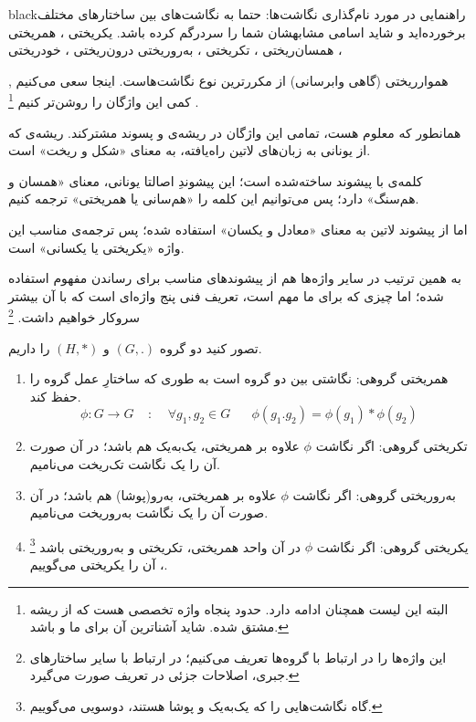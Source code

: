 \documentclass{article}
\begin{document}
\begin{boxes}{black}{راهنمایی در مورد نام‌گذاری نگاشت‌ها:}
	حتما به نگاشت‌های بین ساختارهای مختلف برخورده‌اید و شاید اسامی مشابهشان شما را سردرگم کرده باشد. یکریختی
	، همریختی
	، همسان‌ریختی
	، تکریختی
	، به‌روریختی
	درون‌ریختی
	،
	خودریختی
	
	, هموارریختی
	(گاهی وابرسانی)
	از مکررترین نوع نگاشت‌هاست. اینجا سعی می‌کنیم کمی این واژگان را روشن‌تر کنیم
	\footnote{البته این لیست همچنان ادامه دارد. حدود پنجاه واژه تخصصی هست که از ریشه 
		مشتق شده. شاید آشناترین آن برای ما 
		و
		باشد.
	}
	.
	
	\noindent
	همانطور که معلوم هست، تمامی این واژگان در ریشه‌ی 
	و پسوند 
	مشترکند. ریشه‌ی  که از یونانی به زبان‌های لاتین راه‌یافته، به معنای «شکل و ریخت» است.
	
	\noindent
	کلمه‌ی 
	با پیشوند 
	ساخته‌شده است؛ این پیشوندِ اصالتا یونانی، معنای «همسان و هم‌سنگ» دارد؛ پس می‌توانیم این کلمه را «هم‌سانی یا همریختی» ترجمه کنیم.
	
	\noindent
	اما‌ 
	از پیشوند لاتین 
	به معنای‌ «معادل و یکسان» استفاده شده؛ پس ترجمه‌ی مناسب این واژه «یکریختی یا یکسانی» است.
	
	\noindent
	به همین ترتیب در سایر واژه‌ها هم از پیشوندهای مناسب برای رساندن مفهوم استفاده شده؛ اما چیزی که برای ما مهم است، تعریف فنی پنج واژه‌ای است که با آن بیشتر سروکار خواهیم داشت.
	\footnote{این واژه‌ها را در ارتباط با گروه‌ها تعریف می‌کنیم؛ در ارتباط با سایر ساختارهای جبری، اصلاحات جزئی در تعریف صورت می‌گیرد.}
	
	\noindent
	تصور کنید دو گروه 
	$(G,.)$
	و 
	$(H,*)$
	را داریم.
	
	\begin{enumerate}
		\setlength{\itemsep}{1pt}
		\setlength{\parskip}{0pt}
		\setlength{\parsep}{0pt}
		\item 
		همریختی گروهی: نگاشتی بین دو گروه است به طوری که ساختارِ عمل گروه را حفظ کند.
		\[
		\phi: G \to G \;\;\;\; : \;\;\;\; \forall g_1,g_2 \in G \;\;\;\;\;\; \phi(g_1.g_2) = \phi(g_1)*\phi(g_2)
		\]
		\item 
		تکریختی گروهی: اگر نگاشت 
		$\phi$
		علاوه بر همریختی، یک‌به‌یک هم باشد؛ در آن صورت آن را یک نگاشت تک‌ریخت می‌نامیم.
		\item 
		به‌روریختی گروهی: اگر نگاشت 
		$\phi$
		علاوه بر همریختی، به‌رو(پوشا) هم باشد؛ در آن صورت آن را یک نگاشت به‌روریخت می‌نامیم.
		\item 
		یکریختی گروهی: اگر نگاشت 
		$\phi$
		در آن واحد همریختی، تکریختی و به‌روریختی باشد
		\footnote{گاه نگاشت‌هایی را که یک‌به‌یک و پوشا هستند، دوسویی می‌گوییم.}
		، آن را یکریختی می‌گوییم.
		

\end{enumerate}
\end{boxes}
\end{document}
